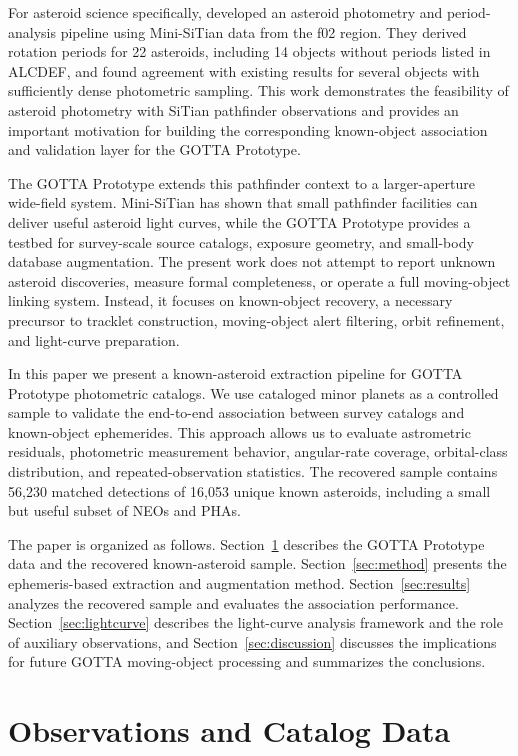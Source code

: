 \documentclass[referee]{raa}
\begin{document}
For asteroid science specifically, \citet{LiuZhaoxing2025AsteroidLC} developed an asteroid photometry and period-analysis pipeline using Mini-SiTian data from the f02 region. They derived rotation periods for 22 asteroids, including 14 objects without periods listed in ALCDEF, and found agreement with existing results for several objects with sufficiently dense photometric sampling. This work demonstrates the feasibility of asteroid photometry with SiTian pathfinder observations and provides an important motivation for building the corresponding known-object association and validation layer for the GOTTA Prototype.

The GOTTA Prototype extends this pathfinder context to a larger-aperture wide-field system. Mini-SiTian has shown that small pathfinder facilities can deliver useful asteroid light curves, while the GOTTA Prototype provides a testbed for survey-scale source catalogs, exposure geometry, and small-body database augmentation. The present work does not attempt to report unknown asteroid discoveries, measure formal completeness, or operate a full moving-object linking system. Instead, it focuses on known-object recovery, a necessary precursor to tracklet construction, moving-object alert filtering, orbit refinement, and light-curve preparation.

In this paper we present a known-asteroid extraction pipeline for GOTTA Prototype photometric catalogs. We use cataloged minor planets as a controlled sample to validate the end-to-end association between survey catalogs and known-object ephemerides. This approach allows us to evaluate astrometric residuals, photometric measurement behavior, angular-rate coverage, orbital-class distribution, and repeated-observation statistics. The recovered sample contains 56,230 matched detections of 16,053 unique known asteroids, including a small but useful subset of NEOs and PHAs.

The paper is organized as follows. Section~\ref{sec:data} describes the GOTTA Prototype data and the recovered known-asteroid sample. Section~\ref{sec:method} presents the ephemeris-based extraction and augmentation method. Section~\ref{sec:results} analyzes the recovered sample and evaluates the association performance. Section~\ref{sec:lightcurve} describes the light-curve analysis framework and the role of auxiliary observations, and Section~\ref{sec:discussion} discusses the implications for future GOTTA moving-object processing and summarizes the conclusions.

\section{Observations and Catalog Data}
\label{sec:data}
\end{document}
